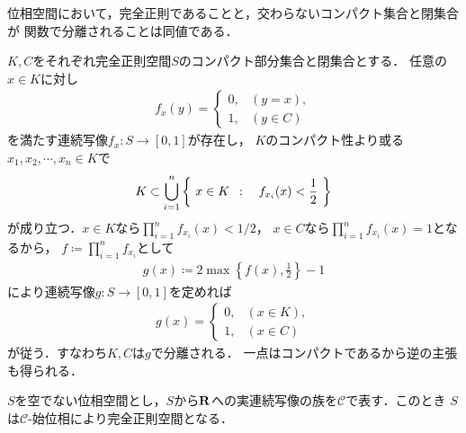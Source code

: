 	\begin{screen}
		\begin{thm}[完全正則空間とは交わらないコンパクト集合と閉集合が関数で分離される空間]
			位相空間において，完全正則であることと，交わらないコンパクト集合と閉集合が
			関数で分離されることは同値である．
		\end{thm}
	\end{screen}
	
	\begin{prf}
		$K,C$をそれぞれ完全正則空間$S$のコンパクト部分集合と閉集合とする．
		任意の$x \in K$に対し
		\begin{align}
			f_x(y) = 
			\begin{cases}
				0, & (y=x), \\
				1, & (y \in C)
			\end{cases} 
		\end{align}
		を満たす連続写像$f_x:S \longrightarrow [0,1]$が存在し，
		$K$のコンパクト性より或る$x_1,x_2,\cdots,x_n \in K$で
		\begin{align}
			K \subset \bigcup_{i=1}^n \left\{\ x \in K\ \, : \quad f_{x_i}(x) < \frac{1}{2}\ \right\}
		\end{align}
		が成り立つ．$x \in K$なら$\prod_{i=1}^n f_{x_i}(x) < 1/2$，
		$x \in C$なら$\prod_{i=1}^n f_{x_i}(x) = 1$となるから，
		$f \coloneqq \prod_{i=1}^n f_{x_i}$として
		\begin{align}
			g(x) \coloneqq 2 \operatorname{max}\left\{f(x),\frac{1}{2}\right\} - 1
		\end{align}
		により連続写像$g:S \longrightarrow [0,1]$を定めれば
		\begin{align}
			g(x) = 
			\begin{cases}
				0, & (x \in K), \\
				1, & (x \in C)
			\end{cases}
		\end{align}
		が従う．すなわち$K,C$は$g$で分離される．
		一点はコンパクトであるから逆の主張も得られる．
		\QED
	\end{prf}
	
	\begin{screen}
		\begin{thm}[実連続写像の族が生成する始位相は完全正則]
		\label{thm:initial_topology_of_continuous_functions_is_completely_regular}
			$S$を空でない位相空間とし，$S$から$\mathbf{R}$への実連続写像の族を$\mathscr{C}$で表す．このとき
			$S$は$\mathscr{C}$-始位相により完全正則空間となる．
		\end{thm}
	\end{screen}
	
